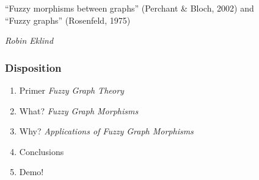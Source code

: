 \documentclass[aspectratio=1610]{beamer}
\begin{document}


\startpage

\begin{frame}
	\vspace{0.02\textheight}

	\begin{Large}
		``Fuzzy morphisms between graphs'' {\small (Perchant \& Bloch, 2002)} and \\ ``Fuzzy graphs'' {\small (Rosenfeld, 1975)}
	\end{Large}

	\vspace{0.1\textheight}

	\begin{small}
		\textit{Robin Eklind}
	\end{small}
\end{frame}


\normalpage

\begin{frame}
	\frametitle{Disposition}

	\begin{enumerate}
		\item Primer \textit{Fuzzy Graph Theory}
		\item What? \textit{Fuzzy Graph Morphisms}
		\item Why? \textit{Applications of Fuzzy Graph Morphisms}
		\item Conclusions
		\item Demo!
	\end{enumerate}
\end{frame}





%


\end{document}
